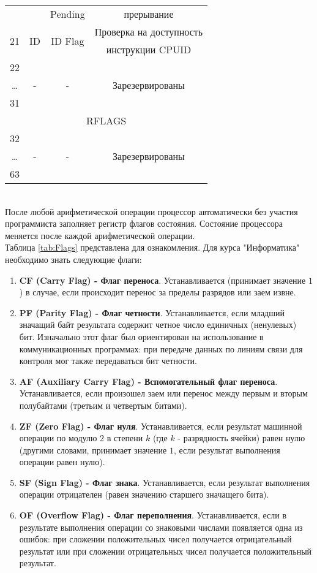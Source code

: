 \begin{table}[h]
\begin{tabular}{|c|c|c|c|}
\\ & & Pending & прерывание
\\ \multirow{2}{*}{21} & \multirow{2}{*}{ID} & \multirow{2}{*}{ID Flag} & Проверка на доступность
\\ & & & инструкции CPUID
\\ 22 & \multirow{3}{*}{-} & \multirow{3}{*}{-} & \multirow{3}{*}{Зарезервированы}
\\ \dots & & &
\\ 31 & & &
\\\hline
\multicolumn{4}{|c|}{RFLAGS} \\
\hline
32 & \multirow{3}{*}{-} & \multirow{3}{*}{-} & \multirow{3}{*}{Зарезервированы}
\\ \dots & & &
\\ 63 & & & \\
\hline
\end{tabular}
\end{table}
\\После любой арифметической операции процессор автоматически без участия программиста заполняет регистр флагов состояния. Состояние процессора меняется после каждой арифметической операции.
\\Таблица \ref{tab:Flags} представлена для ознакомления. Для курса "Информатика" необходимо знать следующие флаги:
\begin{enumerate}
  \item \textbf{CF (Carry Flag) - Флаг переноса}. Устанавливается (принимает значение $1$) в случае, если происходит перенос за пределы разрядов или заем извне.
  \item \textbf{PF (Parity Flag) - Флаг четности}. Устанавливается, если младший значащий байт результата содержит четное число единичных (ненулевых) бит. Изначально этот флаг был ориентирован на использование в коммуникационных программах: при передаче данных по линиям связи для контроля мог также передаваться бит четности.
  \item \textbf{AF (Auxiliary Carry Flag) - Вспомогательный флаг переноса}. Устанавливается, если произошел заем или перенос между первым и вторым полубайтами (третьим и четвертым битами).
  \item \textbf{ZF (Zero Flag) - Флаг нуля}. Устанавливается, если результат машинной операции по модулю 2 в степени $k$ (где $k$ - разрядность ячейки) равен нулю (другими словами, принимает значение $1$, если результат выполнения операции равен нулю).
  \item \textbf{SF (Sign Flag) - Флаг знака}. Устанавливается, если результат выполнения операции отрицателен (равен значению старшего значащего бита).
  \item \textbf{OF (Overflow Flag) - Флаг переполнения}. Устанавливается, если в результате выполнения операции со знаковыми числами появляется одна из ошибок: при сложении положительных чисел получается отрицательный результат или при сложении отрицательных чисел получается положительный результат.
\end{enumerate}

